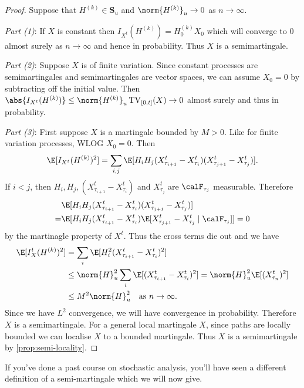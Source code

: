 \documentclass{scrreprt}
\theoremstyle{remark}
\newcommand{\simpro}{\mathbf S}
\DeclareMathOperator{\TV}{TV}
\begin{document}
\begin{proof}
	Suppose that $H^{(k)} \in \simpro_u$ and $\norm{H^{(k)}}_u \to 0$ as $n \to \infty$.

	\emph{Part (1)}: If $X$ is constant then $I_{X^t}(H^{(k)}) = H_0^{(k)} X_0$ which will converge to 0 almost surely as $n \to \infty$ and hence in probability. Thus $X$ is a semimartingale.

	\emph{Part (2)}: Suppose $X$ is of finite variation. Since constant processes are semimartingales and semimartingales are vector spaces, we can assume $X_0 = 0$ by subtracting off the initial value. Then $\abs{I_{X^t}(H^{(k)})} \leq \norm{H^{(k)}}_u \TV_{[0,t]}(X) \to 0$ almost surely and thus in probability.

	\emph{Part (3)}: First suppose $X$ is a martingale bounded by $M > 0$. Like for finite variation processes, WLOG $X_0 = 0$. Then
	\begin{equation}
		\E[ I_{X^t}(H^{(k)})^2 ]
		= \sum_{i, j} \E[H_i H_j (X^t_{\tau_{i+1}} - X^t_{\tau_i})(X^t_{\tau_{j+1}} - X^t_{\tau_j})].
	\end{equation}
	If $i < j$, then $H_i, H_j, (X^t_{\tau_{i+1}} - X^t_{\tau_i})$ and $X^t_{\tau_j}$ are $\calF_{\tau_j}$ measurable. Therefore
	\begin{align}
		&\E[H_i H_j (X^t_{\tau_{i+1}} - X^t_{\tau_i})(X^t_{\tau_{j+1}} - X^t_{\tau_j})] \nonumber \\
		=& \E[H_i H_j (X^t_{\tau_{i+1}} - X^t_{\tau_i})\E[X^t_{\tau_{j+1}} - X^t_{\tau_j} \mid \calF_{\tau_j}]]
		= 0
	\end{align}
	by the martinagle property of $X^t$. Thus the cross terms die out and we have
	\begin{align}
		\E[ I_X^t(H^{(k)})^2 ]
		&= \sum_{i} \E[H_i^2 (X^t_{\tau_{i+1}} - X^t_{\tau_i})^2] \\
		&\leq \norm{H}_u^2 \sum_i \E[(X^t_{\tau_{i+1}} - X^t_{\tau_i})^2] 
		= \norm{H}_u^2 \E[(X^t_{\tau_n})^2]  \\
		&\leq M^2 \norm{H}_u^2 \quad \text{as $n \to \infty$}.
	\end{align}
	Since we have $L^2$ convergence, we will have convergence in probability. Therefore $X$ is a semimartingale. For a general \cadlag{} local martingale $X$, since \cadlag{} paths are locally bounded we can localise $X$ to a bounded martingale. Thus $X$ is a semimartingale by \vref{prop:semi-locality}.
\end{proof}

If you've done a past course on stochastic analysis, you'll have seen a different definition of a semi-martingale which we will now give.
\end{document}
